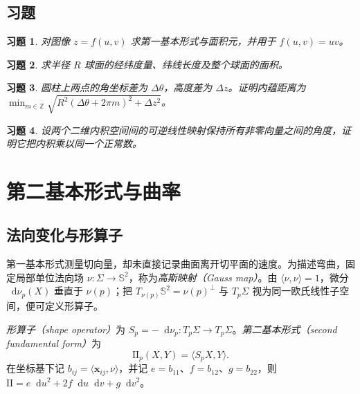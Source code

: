 \documentclass[UTF8,12pt,a4paper,fontset=fandol]{ctexbook}
\newcommand{\dd}{\mathop{}\!\mathrm d}
\newcommand{\ip}[2]{\langle #1,#2\rangle}
\newtheorem{exercise}{习题}[chapter]
\begin{document}
\section{习题}
\begin{exercise}\label{ex:dg-metric-graph}
对图像 $z=f(u,v)$ 求第一基本形式与面积元，并用于 $f(u,v)=uv$。
\end{exercise}
\begin{exercise}\label{ex:dg-metric-sphere}
求半径 $R$ 球面的经纬度量、纬线长度及整个球面的面积。
\end{exercise}
\begin{exercise}\label{ex:dg-metric-cylinder}
圆柱上两点的角坐标差为 $\Delta\theta$，高度差为 $\Delta z$。证明内蕴距离为 $\min_{m\in\mathbb Z}\sqrt{R^2(\Delta\theta+2\pi m)^2+\Delta z^2}$。
\end{exercise}
\begin{exercise}\label{ex:dg-metric-conformal}
设两个二维内积空间间的可逆线性映射保持所有非零向量之间的角度，证明它把内积乘以同一个正常数。
\end{exercise}

\chapter{第二基本形式与曲率}
\label{chap:dg-curvature}

\section{法向变化与形算子}
第一基本形式测量切向量，却未直接记录曲面离开切平面的速度。为描述弯曲，固定局部单位法向场 $\nu:\Sigma\to\mathbb S^2$，称为\emph{高斯映射（Gauss map）}。由 $\ip\nu\nu=1$，微分 $\dd\nu_p(X)$ 垂直于 $\nu(p)$；把 $T_{\nu(p)}\mathbb S^2=\nu(p)^\perp$ 与 $T_p\Sigma$ 视为同一欧氏线性子空间，便可定义形算子。

\begin{definition}[形算子与第二基本形式]
\emph{形算子（shape operator）}为 $S_p=-\dd\nu_p:T_p\Sigma\to T_p\Sigma$。\emph{第二基本形式（second fundamental form）}为
\[
 \mathrm{II}_p(X,Y)=\ip{S_pX}{Y}.
\]
在坐标基下记 $b_{ij}=\ip{\mathbf x_{ij}}\nu$，并记 $e=b_{11}$、$f=b_{12}$、$g=b_{22}$，则 $\mathrm{II}=e\dd u^2+2f\dd u\dd v+g\dd v^2$。
\end{definition}
\end{document}
